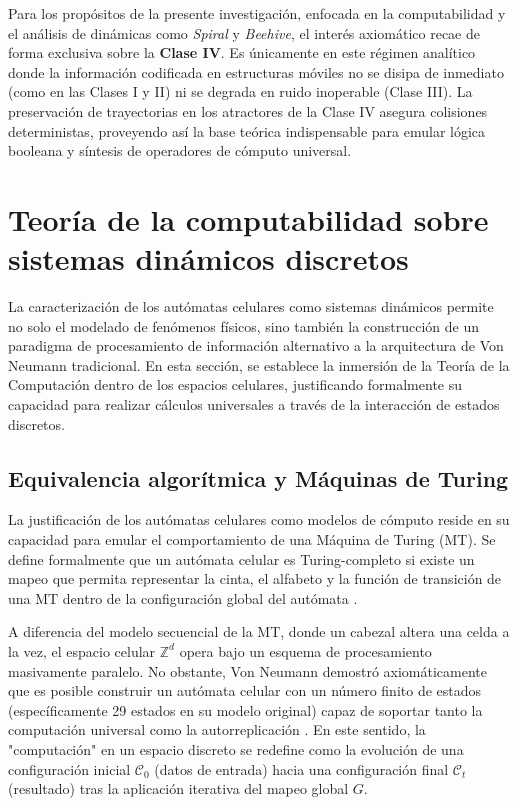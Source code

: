 Para los propósitos de la presente investigación, enfocada en la computabilidad y el análisis de dinámicas como \textit{Spiral} y \textit{Beehive}, el interés axiomático recae de forma exclusiva sobre la \textbf{Clase IV}. Es únicamente en este régimen analítico donde la información codificada en estructuras móviles no se disipa de inmediato (como en las Clases I y II) ni se degrada en ruido inoperable (Clase III). La preservación de trayectorias en los atractores de la Clase IV asegura colisiones deterministas, proveyendo así la base teórica indispensable para emular lógica booleana y síntesis de operadores de cómputo universal.


\section{Teoría de la computabilidad sobre sistemas dinámicos discretos}
\label{sec:teoria_computabilidad}

La caracterización de los autómatas celulares como sistemas dinámicos permite no solo el modelado de fenómenos físicos, sino también la construcción de un paradigma de procesamiento de información alternativo a la arquitectura de Von Neumann tradicional. En esta sección, se establece la inmersión de la Teoría de la Computación dentro de los espacios celulares, justificando formalmente su capacidad para realizar cálculos universales a través de la interacción de estados discretos.

\subsection{Equivalencia algorítmica y Máquinas de Turing}

La justificación de los autómatas celulares como modelos de cómputo reside en su capacidad para emular el comportamiento de una Máquina de Turing (MT). Se define formalmente que un autómata celular es Turing-completo si existe un mapeo que permita representar la cinta, el alfabeto y la función de transición de una MT dentro de la configuración global del autómata \cite{Kari2005}. 

A diferencia del modelo secuencial de la MT, donde un cabezal altera una celda a la vez, el espacio celular $\mathbb{Z}^d$ opera bajo un esquema de procesamiento masivamente paralelo. No obstante, Von Neumann demostró axiomáticamente que es posible construir un autómata celular con un número finito de estados (específicamente 29 estados en su modelo original) capaz de soportar tanto la computación universal como la autorreplicación \cite{vonNeumann1966}. En este sentido, la "computación" en un espacio discreto se redefine como la evolución de una configuración inicial $\mathcal{C}_0$ (datos de entrada) hacia una configuración final $\mathcal{C}_t$ (resultado) tras la aplicación iterativa del mapeo global $G$.

